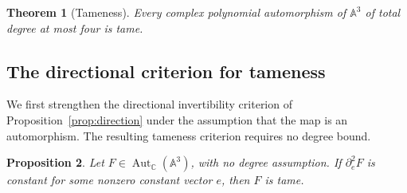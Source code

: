 \documentclass[11pt,reqno]{amsart}
\numberwithin{equation}{section}
\theoremstyle{plain}
\newtheorem{theorem}{Theorem}[section]
\newtheorem{proposition}[theorem]{Proposition}
\theoremstyle{definition}
\theoremstyle{remark}
\newcommand{\C}{\mathbb C}
\newcommand{\A}{\mathbb A}
\newcommand{\Aut}{\operatorname{Aut}}
\begin{document}
\begin{theorem}[Tameness]\label{thm:tame-aut}
Every complex polynomial automorphism of $\A^3$ of total degree at most
four is tame.
\end{theorem}

\subsection{The directional criterion for tameness}\label{t:direction}
We first strengthen the directional invertibility criterion of
Proposition~\ref{prop:direction} under the assumption that the map is an
automorphism. The resulting tameness criterion requires no degree bound.

\begin{proposition}\label{t:directional}
Let $F\in\Aut_{\C}(\A^3)$, with no degree assumption.
If $\partial_e^2F$ is constant for some nonzero constant vector $e$, then $F$ is tame.
\end{proposition}
\end{document}
